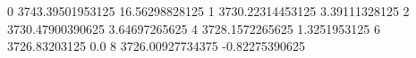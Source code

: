 0 3743.39501953125 16.56298828125
1 3730.22314453125 3.39111328125
2 3730.47900390625 3.64697265625
4 3728.1572265625 1.3251953125
6 3726.83203125 0.0
8 3726.00927734375 -0.82275390625
